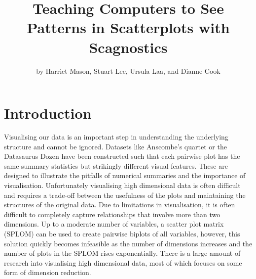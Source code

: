 \title{Teaching Computers to See Patterns in Scatterplots with
Scagnostics}
\author{by Harriet Mason, Stuart Lee, Ursula Laa, and Dianne Cook}

\maketitle


\hypertarget{introduction}{%
\section{Introduction}\label{introduction}}

Visualising our data is an important step in understanding the
underlying structure and cannot be ignored. Datasets like Anscombe's
quartet \citep{anscombe} or the Datasaurus Dozen \citep{datasaurpkg}
have been constructed such that each pairwise plot has the same summary
statistics but strikingly different visual features. These are designed
to illustrate the pitfalls of numerical summaries and the importance of
visualisation. Unfortunately visualising high dimensional data is often
difficult and requires a trade-off between the usefulness of the plots
and maintaining the structures of the original data. Due to limitations
in visualisation, it is often difficult to completely capture
relationships that involve more than two dimensions. Up to a moderate
number of variables, a scatter plot matrix (SPLOM) can be used to create
pairwise biplots of all variables, however, this solution quickly
becomes infeasible as the number of dimensions increases and the number
of plots in the SPLOM rises exponentially. There is a large amount of
research into visualising high dimensional data, most of which focuses
on some form of dimension reduction.


